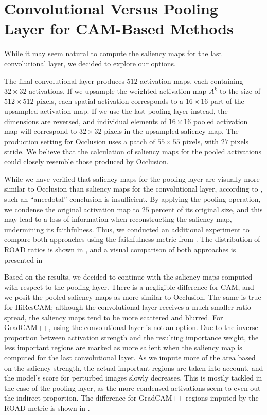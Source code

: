 \pagebreak

\section{Convolutional Versus Pooling Layer for CAM-Based Methods}\label{sec:conv-vs-pool}

While it may seem natural to compute the saliency maps for the last convolutional layer, we decided to explore our options.

The final convolutional layer produces $512$ activation maps, each containing $32 \times 32$ activations.
If we upsample the weighted activation map $A^k$ to the size of $512 \times 512$ pixels, each spatial activation corresponds to a $16 \times 16$ part of the upsampled activation map.
If we use the last pooling layer instead, the dimensions are reversed, and individual elements of $16 \times 16$ pooled activation map will correspond to $32 \times 32$ pixels in the upsampled saliency map.
The production setting for Occlusion uses a patch of $55 \times 55$ pixels, with $27$ pixels stride.
We believe that the calculation of saliency maps for the pooled activations could closely resemble those produced by Occlusion.

While we have verified that saliency maps for the pooling layer are visually more similar to Occlusion than saliency maps for the convolutional layer, according to \cite{xai-anecdotal-evidence}, such an ``anecdotal'' conclusion is insufficient.
By applying the pooling operation, we condense the original activation map to $25$ percent of its original size, and this may lead to a loss of information when reconstructing the saliency map, undermining its faithfulness.
Thus, we conducted an additional experiment to compare both approaches using the faithfulness metric from .
The distribution of ROAD ratios is shown in , and a visual comparison of both approaches is presented in 

Based on the results, we decided to continue with the saliency maps computed with respect to the pooling layer.
There is a negligible difference for CAM, and we posit the pooled saliency maps as more similar to Occlusion.
The same is true for HiResCAM; although the convolutional layer receives a much smaller ratio spread, the saliency maps tend to be more scattered and blurred.
For GradCAM++, using the convolutional layer is not an option.
Due to the inverse proportion between activation strength and the resulting importance weight, the less important regions are marked as more salient when the saliency map is computed for the last convolutional layer.
As we impute more of the area based on the saliency strength, the actual important regions are taken into account, and the model's score for perturbed images slowly decreases.
This is mostly tackled in the case of the pooling layer, as the more condensed activations seem to even out the indirect proportion. 
The difference for GradCAM++ regions imputed by the ROAD metric is shown in .

